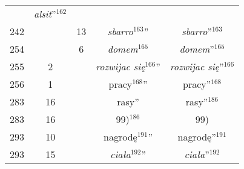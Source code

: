 \documentclass[a4paper,11pt]{article}
\begin{document}
\begin{center}
\begin{tabular}{|c|c|c|c|c|}
    & \textit{alsit}”$^{ 162 }$ \\
    242 & & 13 & \textit{sbarro}$^{ 163 }$” & \textit{sbarro}”$^{ 163 }$ \\
    254 & & \hphantom{0}6
                              & \textit{domem}$^{ 165 }$
    & \textit{domem}”$^{ 165 }$ \\
    255 & \hphantom{0}2 & & \textit{rozwijac się}$^{ 166 }$”
           & \textit{rozwijac się}”$^{ 166 }$ \\
    256 & \hphantom{0}1 & & pracy$^{ 168 }$” & pracy”$^{ 168 }$ \\
    283 & 16 & & rasy” & rasy”$^{ 186 }$ \\
    283 & 16 & & 99)$^{ 186 }$ & 99) \\
    293 & 10 & & nagrodę$^{ 191 }$” & nagrodę”$^{ 191 }$ \\
    293 & 15 & & \textit{ciała}$^{ 192 }$” & \textit{ciała}”$^{ 192 }$ \\
    \hline
  \end{tabular}





  \newpage


\end{center}
\end{document}
